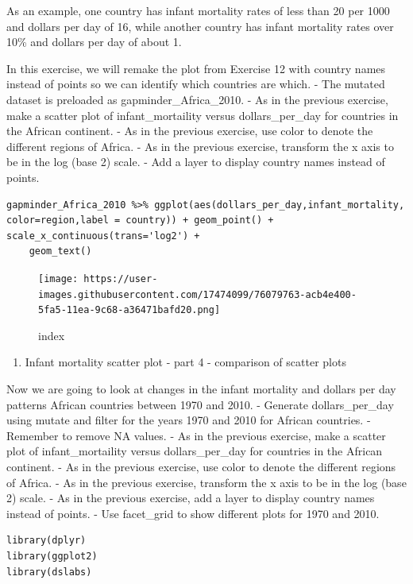 \documentclass[
]{article}
\providecommand{\tightlist}{%
  \setlength{\itemsep}{0pt}\setlength{\parskip}{0pt}}
\begin{document}
As an example, one country has infant mortality rates of less than 20
per 1000 and dollars per day of 16, while another country has infant
mortality rates over 10\% and dollars per day of about 1.

In this exercise, we will remake the plot from Exercise 12 with country
names instead of points so we can identify which countries are which. -
The mutated dataset is preloaded as gapminder\_Africa\_2010. - As in the
previous exercise, make a scatter plot of infant\_mortaility versus
dollars\_per\_day for countries in the African continent. - As in the
previous exercise, use color to denote the different regions of Africa.
- As in the previous exercise, transform the x axis to be in the log
(base 2) scale. - Add a layer to display country names instead of
points.

\begin{verbatim}
gapminder_Africa_2010 %>% ggplot(aes(dollars_per_day,infant_mortality, color=region,label = country)) + geom_point() + scale_x_continuous(trans='log2') +
    geom_text()
\end{verbatim}

\begin{figure}
\centering
\texttt{[image: https://user-images.githubusercontent.com/17474099/76079763-acb4e400-5fa5-11ea-9c68-a36471bafd20.png]}
\caption{index}
\end{figure}

\begin{enumerate}
\def\labelenumi{\arabic{enumi}.}
\setcounter{enumi}{13}
\tightlist
\item
  Infant mortality scatter plot - part 4 - comparison of scatter plots
\end{enumerate}

Now we are going to look at changes in the infant mortality and dollars
per day patterns African countries between 1970 and 2010. - Generate
dollars\_per\_day using mutate and filter for the years 1970 and 2010
for African countries. - Remember to remove NA values. - As in the
previous exercise, make a scatter plot of infant\_mortaility versus
dollars\_per\_day for countries in the African continent. - As in the
previous exercise, use color to denote the different regions of Africa.
- As in the previous exercise, transform the x axis to be in the log
(base 2) scale. - As in the previous exercise, add a layer to display
country names instead of points. - Use facet\_grid to show different
plots for 1970 and 2010.

\begin{verbatim}
library(dplyr)
library(ggplot2)
library(dslabs)
\end{verbatim}
\end{document}
